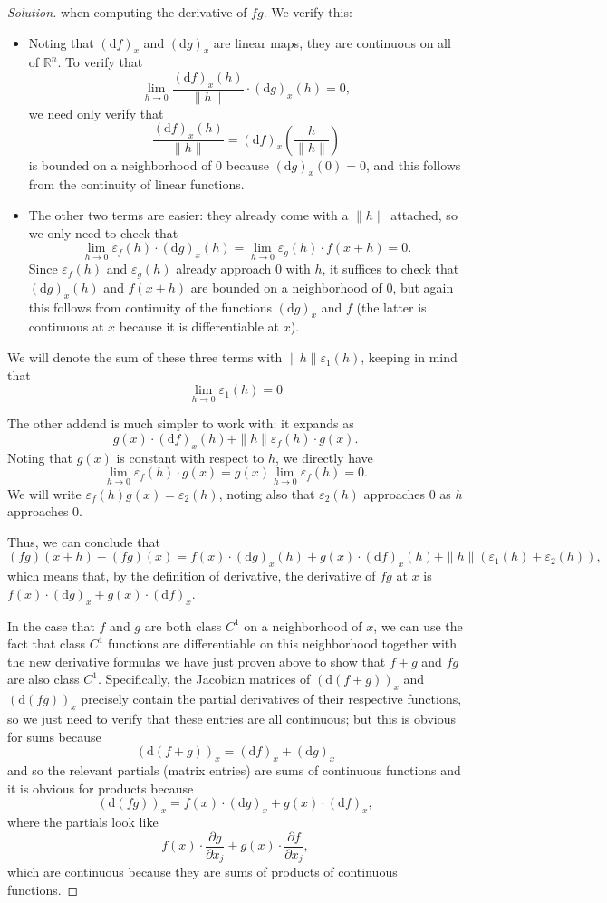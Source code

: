 \documentclass[11pt]{scrartcl}
\providecommand{\eps}{\varepsilon}
\providecommand{\RR}{\mathbb R}
\providecommand{\ii}{\item}
\newenvironment{soln}{\begin{proof}[Solution]}{\end{proof}}
\begin{document}
\begin{soln}
	when computing the derivative of $fg$. We verify this:
	\begin{itemize}
		\ii Noting that $(\mathrm df)_x$ and $(\mathrm dg)_x$ are linear maps,
		they are continuous on all of $\RR^n$. To verify that
		\[\lim_{h\to 0} \frac{(\mathrm df)_x(h)}{\|h\|}\cdot(\mathrm dg)_x(h)
		= 0,\]
		we need only verify that
		\[\frac{(\mathrm df)_x(h)}{\|h\|} =
		(\mathrm df)_x\left(\frac{h}{\|h\|}\right)\]
		is bounded on a neighborhood of $0$ because $(\mathrm dg)_x(0) = 0$,
		and this follows from the continuity of linear functions.
		\ii The other two terms are easier: they already come with a $\|h\|$
		attached, so we only need to check that
		\[\lim_{h\to 0} \eps_f(h)\cdot(\mathrm dg)_x(h) =
		\lim_{h\to 0}\eps_g(h)\cdot f(x+h) = 0.\]
		Since $\eps_f(h)$ and $\eps_g(h)$ already approach $0$ with $h$,
		it suffices to check that $(\mathrm dg)_x(h)$
		and $f(x+h)$ are bounded on a neighborhood of $0$,
		but again this follows from continuity of the functions
		$(\mathrm dg)_x$ and $f$ (the latter is continuous at $x$
		because it is differentiable at $x$).
	\end{itemize}
	We will denote the sum of these three terms with $\|h\|\eps_1(h)$,
	keeping in mind that
	\[\lim_{h\to 0}\eps_1(h) = 0\]

	The other addend is much simpler to work with: it expands as
	\[g(x)\cdot(\mathrm df)_x(h) + \|h\|\eps_f(h)\cdot g(x).\]
	Noting that $g(x)$ is constant with respect to $h$, we directly have
	\[\lim_{h\to 0} \eps_f(h)\cdot g(x) = g(x)\lim_{h\to0}\eps_f(h) = 0.\]
	We will write $\eps_f(h)g(x) = \eps_2(h)$, noting also that
	$\eps_2(h)$ approaches $0$ as $h$ approaches $0$.
	
	Thus, we can conclude that
	\[(fg)(x+h) - (fg)(x) =
	f(x)\cdot(\mathrm dg)_x(h) + g(x)\cdot (\mathrm df)_x(h)
	+ \|h\| (\eps_1(h) + \eps_2(h)),\]
	which means that, by the definition of derivative,
	the derivative of $fg$ at $x$ is
	$f(x)\cdot(\mathrm dg)_x + g(x)\cdot(\mathrm df)_x$.
	
	In the case that $f$ and $g$ are both class $C^1$
	on a neighborhood of $x$, we can use
	the fact that class $C^1$ functions are differentiable on this neighborhood
	together with the new derivative formulas we have just proven above
	to show that $f+g$ and $fg$ are also class $C^1$. Specifically,
	the Jacobian matrices of $(\mathrm d(f+g))_x$ and $(\mathrm d(fg))_x$
	precisely contain the partial derivatives
	of their respective functions, so we just need to verify
	that these entries are all continuous; but this is obvious for sums because
	\[(\mathrm d(f+g))_x = (\mathrm df)_x + (\mathrm dg)_x\]
	and so the relevant partials (matrix entries)
	are sums of continuous functions
	and it is obvious for products because
	\[(\mathrm d(fg))_x = f(x)\cdot (\mathrm dg)_x + g(x)\cdot(\mathrm df)_x,\]
	where the partials look like
	\[f(x)\cdot\frac{\partial g}{\partial x_j} +
	g(x)\cdot \frac{\partial f}{\partial x_j},\]
	which are continuous because they are sums of products
	of continuous functions.
\end{soln}
\end{document}
